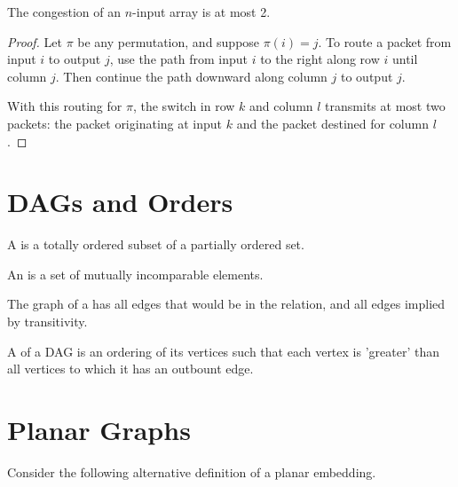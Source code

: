 \documentclass[quiz]{mcs}
\begin{document}
\begin{theorem*} 
The congestion of an $n$-input array is at most 2. 
\end{theorem*} 
 
\begin{proof} 
  Let $\pi$ be any permutation, and suppose $\pi(i)=j$.  To route a packet 
  from input $i$ to output $j$, use the path from input $i$ to the right 
  along row $i$ until column $j$.  Then continue the path downward along 
  column $j$ to output $j$. 
 
  With this routing for $\pi$, the switch in row $k$ and column $l$ 
  transmits at most two packets: the packet originating at input $k$ and 
  the packet destined for column $l$. 
\end{proof} 

\section{DAGs and Orders}

A  is a totally ordered subset of a partially ordered set.

An  is a set of mutually incomparable elements.

The graph of a  has all edges that would
      be in the relation, and all edges implied by transitivity.

A  of a DAG is an ordering of its vertices
      such that each vertex is 'greater' than all vertices to which it has
      an outbount edge.
\fi

\section{Planar Graphs}
Consider the following alternative definition of a planar embedding.
\end{document}
